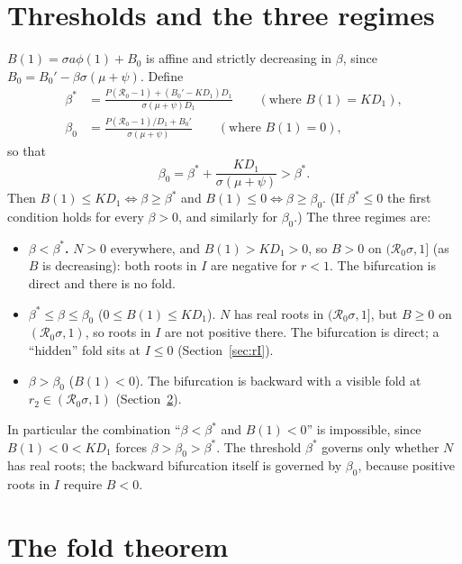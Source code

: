 \documentclass[11pt]{article}
\theoremstyle{remark}
\newcommand{\R}{\mathcal R_0}
\begin{document}
\section{Thresholds and the three regimes}\label{sec:thresholds}

$B(1)=\sigma a\phi(1)+B_0$ is affine and strictly decreasing in $\beta$, since $B_0=B_0'-\beta\sigma(\mu+\psi)$. Define
\begin{align}
\beta^*&=\frac{P(\R-1)+(B_0'-KD_1)D_1}{\sigma(\mu+\psi)D_1}\qquad(\text{where }B(1)=KD_1),\label{eq:betastar}\\
\beta_0&=\frac{P(\R-1)/D_1+B_0'}{\sigma(\mu+\psi)}\qquad(\text{where }B(1)=0),\label{eq:beta0}
\end{align}
so that
\[
\beta_0=\beta^*+\frac{KD_1}{\sigma(\mu+\psi)}>\beta^* .
\]
Then $B(1)\le KD_1\iff\beta\ge\beta^*$ and $B(1)\le0\iff\beta\ge\beta_0$. (If $\beta^*\le0$ the first condition holds for every $\beta>0$, and similarly for $\beta_0$.) The three regimes are:

\begin{itemize}
\item \textbf{$\beta<\beta^*$.} $N>0$ everywhere, and $B(1)>KD_1>0$, so $B>0$ on $(\R\sigma,1]$ (as $B$ is decreasing): both roots in $I$ are negative for $r<1$. The bifurcation is direct and there is no fold.
\item \textbf{$\beta^*\le\beta\le\beta_0$} ($0\le B(1)\le KD_1$). $N$ has real roots in $(\R\sigma,1]$, but $B\ge0$ on $(\R\sigma,1)$, so roots in $I$ are not positive there. The bifurcation is direct; a ``hidden'' fold sits at $I\le0$ (Section~\ref{sec:rI}).
\item \textbf{$\beta>\beta_0$} ($B(1)<0$). The bifurcation is backward with a visible fold at $r_2\in(\R\sigma,1)$ (Section~\ref{sec:fold}).
\end{itemize}
In particular the combination ``$\beta<\beta^*$ and $B(1)<0$'' is impossible, since $B(1)<0<KD_1$ forces $\beta>\beta_0>\beta^*$. The threshold $\beta^*$ governs only whether $N$ has real roots; the backward bifurcation itself is governed by $\beta_0$, because positive roots in $I$ require $B<0$.

\section{The fold theorem}\label{sec:fold}
\end{document}
